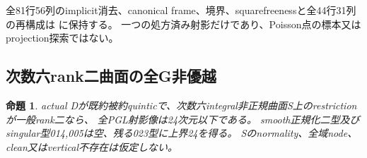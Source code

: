 \documentclass[a4paper,11pt]{ltjsarticle}
\newtheorem{proposition}{命題}[section]
\theoremstyle{definition}
\begin{document}
全81行56列のimplicit消去、canonical frame、境界、squarefreenessと全44行31列の再構成は
に保持する。
一つの処方済み射影だけであり、Poisson点の標本又はprojection探索ではない。

\subsection{次数六rank二曲面の全G非優越}
\begin{proposition}\label{prop:ranktwo-sextic-all-G}
actual Dが既約被約quinticで、次数六integral非正規曲面S上のrestrictionが一般rank二なら、
全PGL射影像は24次元以下である。
smooth正規化二型及びsingular型014,005は空、残る023型に上界24を得る。
Sのnormality、全域node、clean又はvertical不存在は仮定しない。
\end{proposition}
\end{document}
